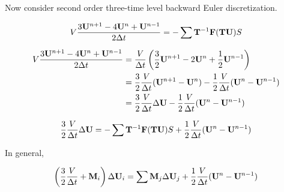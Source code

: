 \documentclass{article}
\begin{document}
Now consider second order three-time level backward Euler discretization.

\begin{equation}
    V\frac{3\mathbf{U}^{n+1}-4\mathbf{U}^n+\mathbf{U}^{n-1}}{2\Delta t}
    =
    -\sum\mathbf{T}^{-1}\mathbf{F}(\mathbf{T}\mathbf{U})S
\end{equation}

\begin{equation}
    \begin{aligned}
        V\frac{3\mathbf{U}^{n+1}-4\mathbf{U}^n+\mathbf{U}^{n-1}}{2\Delta t}
        &=
        \frac{V}{\Delta t}
        \left(
            \frac{3}{2}\mathbf{U}^{n+1}-2\mathbf{U}^n+\frac{1}{2}\mathbf{U}^{n-1}
        \right)
        \\
        &=
        \frac{3}{2}\frac{V}{\Delta t}(\mathbf{U}^{n+1}-\mathbf{U}^n)
        -
        \frac{1}{2}\frac{V}{\Delta t}(\mathbf{U}^{n} - \mathbf{U}^{n-1})
        \\
        &=
        \frac{3}{2}\frac{V}{\Delta t}\Delta\mathbf{U}
        -
        \frac{1}{2}\frac{V}{\Delta t}(\mathbf{U}^{n} - \mathbf{U}^{n-1})
    \end{aligned}
\end{equation}

\begin{equation}
    \frac{3}{2}\frac{V}{\Delta t}\Delta\mathbf{U}
    =
    -\sum\mathbf{T}^{-1}\mathbf{F}(\mathbf{T}\mathbf{U})S + \frac{1}{2}\frac{V}{\Delta t}(\mathbf{U}^{n} - \mathbf{U}^{n-1})
\end{equation}

In general,

\begin{equation}
    \left(
        \frac{3}{2}\frac{V}{\Delta t} + \mathbf{M}_i
    \right)
    \Delta\mathbf{U}_i
    =
    \sum\mathbf{M}_j\Delta\mathbf{U}_j + \frac{1}{2}\frac{V}{\Delta t}(\mathbf{U}^{n} - \mathbf{U}^{n-1})
\end{equation}
\end{document}
